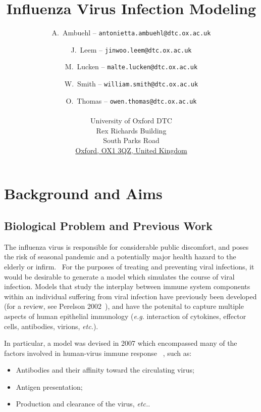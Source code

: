 \documentclass[a4paper, 12pt]{report}
\title{Influenza Virus Infection Modeling}
\author{A.~Ambuehl -- \texttt{antonietta.ambuehl@dtc.ox.ac.uk} \and J.~Leem -- \texttt{jinwoo.leem@dtc.ox.ac.uk} \and M.~Lucken -- \texttt{malte.lucken@dtc.ox.ac.uk} \and W.~Smith -- \texttt{william.smith@dtc.ox.ac.uk} \and O.~Thomas -- \texttt{owen.thomas@dtc.ox.ac.uk} \\\\
University of Oxford DTC \\
Rex Richards Building \\
South Parks Road\\
\underline{Oxford, OX1 3QZ, United Kingdom}\\
}
\begin{document}
\maketitle

%




\chapter{Background and Aims} %
\section{Biological Problem and Previous Work}

The influenza virus is responsible for considerable public discomfort, and poses the risk of seasonal pandemic and a potentially major health hazard to the elderly or infirm.~\cite{Smith} For the purposes of treating and preventing viral infections, it would be desirable to generate a model which simulates the course of viral infection. Models that study the interplay between immune system components within an individual suffering from viral infection have previously been developed (for a review, see Perelson 2002~\cite{Perelson}), and have the potenital to capture multiple aspects of human epithelial immunology (\textit{e.g.} interaction of cytokines, effector cells, antibodies, virions, \textit{etc.}). 

In particular, a model was devised in 2007 which encompassed many of the factors involved in human-virus immune response ~\cite{Hancioglu}, such as:

\begin{itemize}
\item Antibodies and their affinity toward the circulating virus;
\item Antigen presentation;
\item Production and clearance of the virus, \textit{etc.}.
\end{itemize}
\end{document}
